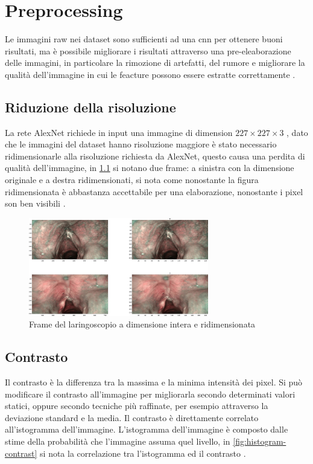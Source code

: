 \chapter{Preprocessing}\label{preprocessing}

Le immagini raw nei dataset sono sufficienti ad una \gls{cnn} per ottenere buoni risultati, ma è possibile migliorare i risultati attraverso una pre-eleaborazione delle immagini, in particolare la rimozione di artefatti,  del rumore e migliorare la qualità dell'immagine 
in cui le feacture  possono essere estratte correttamente \cite{permual_contrast}.

\section{Riduzione della risoluzione}\label{riduzione-della-risoluzione}

La rete AlexNet richiede in input una immagine di dimension \(227 \times 227 \times 3\) \cite{alexnet}, dato che le immagini del dataset hanno risoluzione maggiore è stato necessario ridimensionarle alla risoluzione richiesta da AlexNet, questo causa una perdita di qualità dell'immagine, in \cref{fig:resize} si notano due frame: a sinistra con la dimensione originale e a destra ridimensionati, si nota come nonostante la figura ridimensionata è abbastanza accettabile per una elaborazione, nonostante i pixel son ben visibili \cite{gonzalez_dip}.

\begin{figure}[ht]
    \centering
    \includegraphics[width=0.7\textwidth]{preprocessing/resize.pdf}
    \caption{Frame del laringoscopio a dimensione intera e ridimensionata}
    \label{fig:resize}
\end{figure}

\section{Contrasto}\label{contrasto}

Il contrasto è la differenza tra la massima e la minima
intensità dei pixel. Si può modificare il contrasto all'immagine per migliorarla secondo determinati valori statici, oppure secondo tecniche più raffinate, per esempio attraverso la deviazione standard e la media. Il contrasto è direttamente correlato all'istogramma dell'immagine. L'istogramma dell'immagine è composto dalle stime della probabilità che l'immagine assuma quel livello, in \cref{fig:histogram-contrast} si nota la correlazione tra l'istogramma ed il contrasto \cite{permual_contrast}  \cite{hummel_histogram} \cite{pandey_contrast} \cite{gonzalez_dip}.

